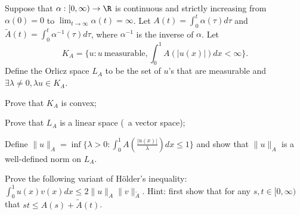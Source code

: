 Suppose that $\alpha: [0,\infty) \rightarrow \R$ is continuous and
strictly increasing from $\alpha(0)=0$ to $\lim_{t\rightarrow
\infty} \alpha(t)=\infty$. Let $A(t)=\int_{0}^t\alpha(\tau)d\tau$ and
$\tilde{A}(t)=\int_{0}^t\alpha^{-1}(\tau)d\tau$, where $\alpha^{-1}$
is the inverse of $\alpha$. Let $$K_A=\{u: u\ \mathrm{measurable},
\int_{0}^1A(|u(x)|)dx<\infty\}.$$ 
Define the Orlicz space $L_A$ to be the set of $u$'s that are
measurable and $\exists \lambda\neq 0,
\lambda u \in K_A$.
\begin{alist}
\item Prove that $K_A$ is convex;
\item Prove that $L_A$ is a linear space (\ie\ a vector space);
\item Define $\|u\|_A=\inf \{\lambda>0: \int_{0}^1 A
(\frac{|u(x)|}{\lambda}) dx \leq 1\}$ and show that $\|u\|_A$ is a
well-defined norm on $L_A$.
\item Prove the following variant of H\"older's inequality: 
$\int_{0}^1 u(x)v(x)dx \leq 2\|u\|_A \|v\|_{\tilde{A}}$. Hint: first
show that for any $s,t\in [0,\infty)$ that $st\leq A(s)+\tilde{A}(t)$.
\end{alist}

